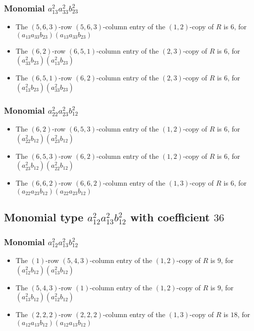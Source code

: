 \documentclass{article}
\begin{document}
\subsubsection{Monomial $ a_{13}^{2} a_{33}^{2} b_{23}^{2} $}

\begin{itemize}
\item The $(5, 6, 3)$-row $(5, 6, 3)$-column entry of the $ \left(1, 2\right) $-copy of $R$ is $ 6 $, for $( a_{13} a_{33} b_{23} )( a_{13} a_{33} b_{23} )$ 
\item The $(6, 2)$-row $(6, 5, 1)$-column entry of the $ \left(2, 3\right) $-copy of $R$ is $ 6 $, for $( a_{33}^{2} b_{23} )( a_{13}^{2} b_{23} )$ 
\item The $(6, 5, 1)$-row $(6, 2)$-column entry of the $ \left(2, 3\right) $-copy of $R$ is $ 6 $, for $( a_{13}^{2} b_{23} )( a_{33}^{2} b_{23} )$ 
\end{itemize}
\subsubsection{Monomial $ a_{22}^{2} a_{23}^{2} b_{12}^{2} $}

\begin{itemize}
\item The $(6, 2)$-row $(6, 5, 3)$-column entry of the $ \left(1, 2\right) $-copy of $R$ is $ 6 $, for $( a_{22}^{2} b_{12} )( a_{23}^{2} b_{12} )$ 
\item The $(6, 5, 3)$-row $(6, 2)$-column entry of the $ \left(1, 2\right) $-copy of $R$ is $ 6 $, for $( a_{23}^{2} b_{12} )( a_{22}^{2} b_{12} )$ 
\item The $(6, 6, 2)$-row $(6, 6, 2)$-column entry of the $ \left(1, 3\right) $-copy of $R$ is $ 6 $, for $( a_{22} a_{23} b_{12} )( a_{22} a_{23} b_{12} )$ 
\end{itemize}
\subsection{Monomial type $ a_{12}^{2} a_{13}^{2} b_{12}^{2} $ with coefficient $ 36 $}

\subsubsection{Monomial $ a_{12}^{2} a_{13}^{2} b_{12}^{2} $}

\begin{itemize}
\item The $(1)$-row $(5, 4, 3)$-column entry of the $ \left(1, 2\right) $-copy of $R$ is $ 9 $, for $( a_{12}^{2} b_{12} )( a_{13}^{2} b_{12} )$ 
\item The $(5, 4, 3)$-row $(1)$-column entry of the $ \left(1, 2\right) $-copy of $R$ is $ 9 $, for $( a_{13}^{2} b_{12} )( a_{12}^{2} b_{12} )$ 
\item The $(2, 2, 2)$-row $(2, 2, 2)$-column entry of the $ \left(1, 3\right) $-copy of $R$ is $ 18 $, for $( a_{12} a_{13} b_{12} )( a_{12} a_{13} b_{12} )$ 
\end{itemize}
\end{document}
